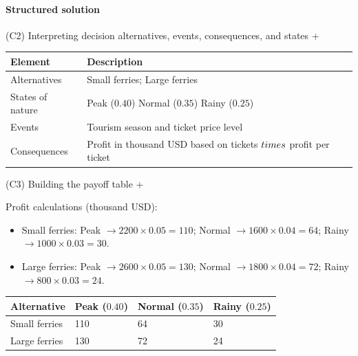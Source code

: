 \documentclass[11pt]{article}
\begin{document}
	\hypertarget{problem7-solution}{}
	
	\paragraph{Structured solution}
	
	
	(C2) Interpreting decision alternatives, events, consequences, and states
	+
	
	
	\begin{center}
		\begin{tabular}{ll}
			\toprule
			Element & Description \\
			\midrule
			Alternatives & Small ferries; Large ferries \\
			States of nature & Peak
			($0.40$)
			Normal
			($0.35$)
			Rainy
			($0.25$) \\
			Events & Tourism season and ticket price level \\
			Consequences & Profit in thousand USD based on tickets $\\times$ profit per ticket \\
			\bottomrule
		\end{tabular}
	\end{center}
	
	
	
	
	
	
	(C3) Building the payoff table
	+
	
	
	Profit calculations (thousand USD):
	\begin{itemize}
		\item Small ferries: Peak $\to 2200 \times 0.05 = 110$; Normal $\to 1600 \times 0.04 = 64$; Rainy $\to 1000 \times 0.03 = 30$.
		\item Large ferries: Peak $\to 2600 \times 0.05 = 130$; Normal $\to 1800 \times 0.04 = 72$; Rainy $\to 800 \times 0.03 = 24$.
	\end{itemize}
	
	\begin{center}
		\begin{tabular}{llll}
			\toprule
			Alternative & Peak
			($0.40$) & Normal
			($0.35$) & Rainy
			($0.25$) \\
			\midrule
			Small ferries & 110 & 64 & 30 \\
			Large ferries & 130 & 72 & 24 \\
			\bottomrule
		\end{tabular}
	\end{center}
	
	
	
\end{document}
